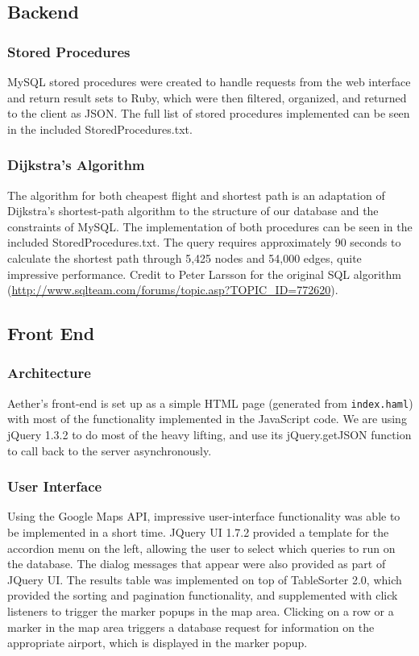 \documentclass[12pt, letterpaper]{article}
\begin{document}
\subsection{Backend}

\subsubsection{Stored Procedures}
MySQL stored procedures were created to handle requests from the web interface and return result sets to Ruby, which were then filtered, organized, and returned to the client as JSON. The full list of stored procedures implemented can be seen in the included StoredProcedures.txt.

\subsubsection{Dijkstra's Algorithm}
The algorithm for both cheapest flight and shortest path is an adaptation of Dijkstra's shortest-path algorithm to the structure of our database and the constraints of MySQL. The implementation of both procedures can be seen in the included StoredProcedures.txt.  The query requires approximately 90 seconds to calculate the shortest path through 5,425 nodes and 54,000 edges, quite impressive performance. Credit to Peter Larsson for the original SQL algorithm (\mbox{\url{http://www.sqlteam.com/forums/topic.asp?TOPIC_ID=772620}}).

\subsection{Front End}
\subsubsection{Architecture}
Aether's front-end is set up as a simple HTML page (generated from \verb!index.haml!) with most of the functionality implemented in the JavaScript code. We are using jQuery 1.3.2 to do most of the heavy lifting, and use its jQuery.getJSON function to call back to the server asynchronously.

\subsubsection{User Interface}
Using the Google Maps API, impressive user-interface functionality was able to be implemented in a short time. JQuery UI 1.7.2 provided a template for the accordion menu on the left, allowing the user to select which queries to run on the database. The dialog messages that appear were also provided as part of JQuery UI. The results table was implemented on top of TableSorter 2.0, which provided the sorting and pagination functionality, and supplemented with click listeners to trigger the marker popups in the map area. Clicking on a row or a marker in the map area triggers a database request for information on the appropriate airport, which is displayed in the marker popup.
\end{document}

